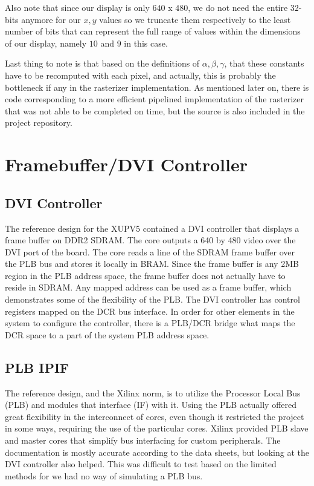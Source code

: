 \documentclass[letterpaper,10pt]{article}
\begin{document}
Also note that since our display is only $640$ x $480$, we do not need the entire 32-bits anymore for our $x,y$ values so we truncate them respectively to the least number of bits that can represent the full range of values within the dimensions of our display, namely $10$ and $9$ in this case.

Last thing to note is that based on the definitions of $\alpha, \beta, \gamma$, that these constants have to be recomputed with each pixel, and actually, this is probably the bottleneck if any in the rasterizer implementation. As mentioned later on, there is code corresponding to a more efficient pipelined implementation of the rasterizer that was not able to be completed on time, but the source is also included in the project repository.

\section{Framebuffer/DVI Controller}

\subsection{DVI Controller}
The reference design for the XUPV5 contained a DVI controller that displays a frame buffer on DDR2 SDRAM.  The core outputs a 640 by 480 video over the DVI port of the board.  The core reads a line of the SDRAM frame buffer over the PLB bus and stores it locally in BRAM. Since the frame buffer is any 2MB region in the PLB address space, the frame buffer does not actually have to reside in SDRAM.  Any mapped address can be used as a frame buffer, which demonstrates some of the flexibility of the PLB.  The DVI controller has control registers mapped on the DCR bus interface.  In order for other elements in the system to configure the controller, there is a PLB/DCR bridge what maps the DCR space to a part of the system PLB address space.


\subsection{PLB IPIF}
The reference design, and the Xilinx norm, is to utilize the Processor Local Bus (PLB) and modules that interface (IF) with it.  Using the PLB actually offered great flexibility in the interconnect of cores, even though it restricted the project in some ways, requiring the use of the particular cores.  Xilinx provided PLB slave and master cores that simplify bus interfacing for custom peripherals.  The documentation is mostly accurate according to the data sheets, but looking at the DVI controller also helped.  This was difficult to test based on the limited methods for we had no way of simulating a PLB bus.
\end{document}
